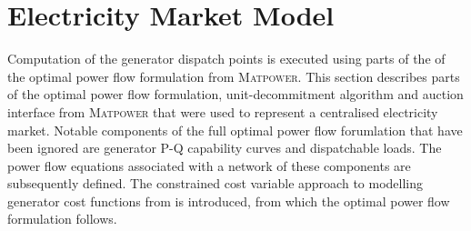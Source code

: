 %
%
%
%
%
%

\section{Electricity Market Model}
Computation of the generator dispatch points is executed using parts of the
of the optimal power flow formulation from \textsc{Matpower}.
This section describes parts of the optimal power flow formulation,
unit-decommitment algorithm and auction interface from \textsc{Matpower} that
were used to represent a centralised electricity market.  Notable components
of the full optimal power flow forumlation that have been ignored are
generator P-Q capability curves and dispatchable loads. The power flow
equations associated with a network of these components are subsequently
defined. The constrained cost variable approach to modelling generator cost
functions from \cite{zimmerman:ccv} is introduced, from which the optimal
power flow formulation follows.

